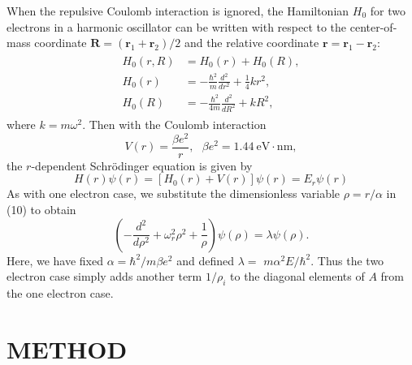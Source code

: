 \documentclass[prb,aps,twocolumn,showpacs,10pt]{revtex4-1}
\begin{document}
When the repulsive Coulomb interaction is ignored, the Hamiltonian $H_0$ for two electrons in a harmonic oscillator can be written with respect to the center-of-mass coordinate $\mathbf{R}=(\mathbf{r}_1+\mathbf{r}_2)/2$ and the relative coordinate $\mathbf{r}=\mathbf{r}_1-\mathbf{r}_2$:
\begin{align}
\label{eqn:eqlabel}
\begin{split}
H_0(r,R) &= H_0(r) + H_0(R),\\
H_0(r) &=-\frac{\hbar^2}{m} \frac{d^2}{dr^2} + \frac{1}{4} k r^2,\\
H_0(R) &= -\frac{\hbar^2}{4m} \frac{d^2}{dR^2} + kR^2,
\end{split}
\end{align}
where $k=m\omega^2$. Then with the Coulomb interaction
\begin{equation}
V(r) = \frac{\beta e^2}{r}, \ \ \ \beta e^2 = 1.44 \ \text{eV} \cdot \text{nm},
\end{equation}
the $r$-dependent Schr{\"o}dinger equation is given by
\begin{equation}
H(r)\psi(r)=[H_0(r)+V(r)]\psi(r)=E_r \psi(r)
\end{equation}
As with one electron case, we substitute the dimensionless variable $\rho=r/\alpha$ in (10) to obtain
\begin{equation}
\left( -\frac{d^2}{d\rho^2} + \omega_r^2\rho^2 + \frac{1}{\rho}\right) \psi(\rho) = \lambda\psi(\rho).
\end{equation}
Here, we have fixed $\alpha=\hbar^2/m\beta e^2$ and defined $\lambda = $ 
$m\alpha^2E/\hbar^2$. Thus the two electron case simply adds another term $1/\rho_i$ to the diagonal elements of $A$ from the one electron case. 

\section{METHOD}
\end{document}
